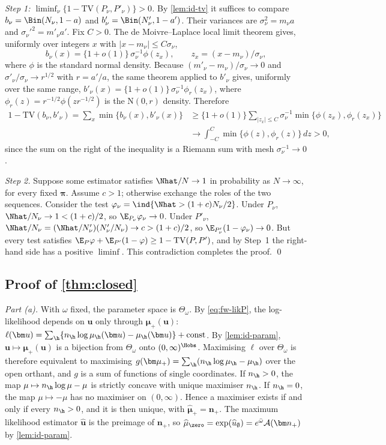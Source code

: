 \emph{Step 1: $\liminf_\nu\{1-\mathrm{TV}(P_\nu,P'_\nu)\}>0$.} By \cref{lem:id-tv} it suffices to compare $b_\nu=\Bin(N_\nu,1-a)$ and $b'_\nu=\Bin(N'_\nu,1-a')$. Their variances are $\sigma_\nu^2=m_\nu a$ and $\sigma_\nu'^2=m'_\nu a'$. Fix $C>0$. The de Moivre--Laplace local limit theorem \citep[Ch.~VII]{feller1968} gives, uniformly over integers $x$ with $|x-m_\nu|\le C\sigma_\nu$,
\[
  b_\nu(x)=\{1+o(1)\}\,\sigma_\nu^{-1}\phi(z_x),\qquad z_x=(x-m_\nu)/\sigma_\nu,
\]
where $\phi$ is the standard normal density. Because $(m'_\nu-m_\nu)/\sigma_\nu\to0$ and $\sigma'_\nu/\sigma_\nu\to r^{1/2}$ with $r=a'/a$, the same theorem applied to $b'_\nu$ gives, uniformly over the same range,
$b'_\nu(x)=\{1+o(1)\}\,\sigma_\nu^{-1}\phi_r(z_x)$, where $\phi_r(z)=r^{-1/2}\phi(zr^{-1/2})$ is the $\mathrm N(0,r)$ density. Therefore
\begin{align*}
  1-\mathrm{TV}(b_\nu,b'_\nu)=\sum_x\min\{b_\nu(x),b'_\nu(x)\}
  &\ge\{1+o(1)\}\sum_{|z_x|\le C}\sigma_\nu^{-1}\min\{\phi(z_x),\phi_r(z_x)\}\\
  &\longrightarrow\int_{-C}^{C}\min\{\phi(z),\phi_r(z)\}\,dz>0,
\end{align*}
since the sum on the right of the inequality is a Riemann sum with mesh $\sigma_\nu^{-1}\to0$.

\emph{Step 2.} Suppose some estimator satisfies $\Nhat/N\to1$ in probability as $N\to\infty$, for every fixed $\bm\pi$. Assume $c>1$; otherwise exchange the roles of the two sequences. Consider the test $\varphi_\nu=\ind{\Nhat>(1+c)N_\nu/2}$. Under $P_\nu$, $\Nhat/N_\nu\to1<(1+c)/2$, so $\E_{P_\nu}\varphi_\nu\to0$. Under $P'_\nu$, $\Nhat/N_\nu=(\Nhat/N'_\nu)(N'_\nu/N_\nu)\to c>(1+c)/2$, so $\E_{P'_\nu}(1-\varphi_\nu)\to0$. But every test satisfies $\E_{P}\varphi+\E_{P'}(1-\varphi)\ge1-\mathrm{TV}(P,P')$, and by Step~1 the right-hand side has a positive $\liminf$. This contradiction completes the proof. \qed

\subsection{Proof of \texorpdfstring{\cref{thm:closed}}{the closed-form theorem}}\label{app:id-closed}

\emph{Part (a).} With $\omega$ fixed, the parameter space is $\Theta_\omega$. By \eqref{eq:fw-likP}, the log-likelihood depends on $\bm u$ only through $\bm\mu_+(\bm u)$:
$\ell(\bm u)=\sum_{\h}\{n_{\h}\log\mu_{\h}(\bm u)-\mu_{\h}(\bm u)\}+\mathrm{const}$.
By \cref{lem:id-param}, $\bm u\mapsto\bm\mu_+(\bm u)$ is a bijection from $\Theta_\omega$ onto $(0,\infty)^{\Hobs}$. Maximising $\ell$ over $\Theta_\omega$ is therefore equivalent to maximising $g(\bm\mu_+)=\sum_{\h}(n_{\h}\log\mu_{\h}-\mu_{\h})$ over the open orthant, and $g$ is a sum of functions of single coordinates. If $n_{\h}>0$, the map $\mu\mapsto n_{\h}\log\mu-\mu$ is strictly concave with unique maximiser $n_{\h}$. If $n_{\h}=0$, the map $\mu\mapsto-\mu$ has no maximiser on $(0,\infty)$. Hence a maximiser exists if and only if every $n_{\h}>0$, and it is then unique, with $\widehat{\bm\mu}_+=\bm n_+$. The maximum likelihood estimator $\widehat{\bm u}$ is the preimage of $\bm n_+$, so $\widehat\mu_{\zero}=\exp(\widehat u_\emptyset)=e^{\bar\omega}\mathcal A(\bm n_+)$ by \cref{lem:id-param}.

